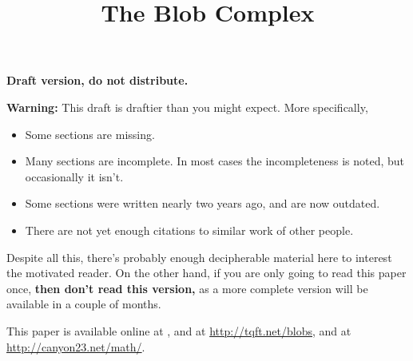 \documentclass[11pt,leqno]{amsart}
\title{The Blob Complex}
\begin{document}
\makeatletter
{}
\gdef\theequation{\thesection.\arabic{equation}}
\makeatother

\maketitle



\textbf{Draft version, do not distribute.}


\medskip

\noindent
{\bf Warning:} This draft is draftier than you might expect.
More specifically,
\begin{itemize}
\item Some sections are missing.
\item Many sections are incomplete.
In most cases the incompleteness is noted, but occasionally it isn't.
\item Some sections were written nearly two years ago, and are now outdated.
\item There are not yet enough citations to similar work of other people.
\end{itemize}
Despite all this, there's probably enough decipherable material
here to interest the motivated reader.
On the other hand, if you are only going to read this paper once,
{\bf then don't read this version,} as a more complete version will be available in a couple of months.






















\appendix







%




This paper is available online at , and at
\url{http://tqft.net/blobs},
and at \url{http://canyon23.net/math/}.

\end{document}
